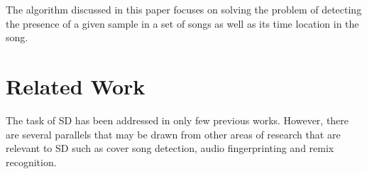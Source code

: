 \documentclass{article}
\begin{document}
The algorithm discussed in this paper focuses on solving the problem of detecting the presence of a given sample in a set of songs as well as its time location in the song.

%
\section{Related Work}
\label{related}
The task of SD has been addressed in only few previous works. However, there are several parallels that may be drawn from other areas of research that are relevant to SD such as cover song detection, audio fingerprinting and remix recognition. %

\end{document}
